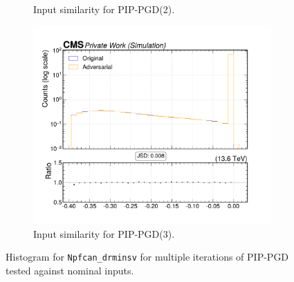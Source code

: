 \begin{figure}[htbp]
\begin{subfigure}[t]{0.32\textwidth}
    \caption*{Input similarity for PIP-PGD(2).}
  \end{subfigure}\hfill
  \begin{subfigure}[t]{0.32\textwidth}
    \includegraphics[width=\linewidth]{media/output/features/compare/combined_it_3/cmp_npf_arr_Npfcan_drminsv.pdf}
    \caption*{Input similarity for PIP-PGD(3).}
  \end{subfigure}

  \caption*{Histogram for \texttt{Npfcan\_drminsv} for multiple iterations of PIP-PGD tested against nominal inputs.}
  \label{fig:combined_input_Npfcan_drminsv}
\end{figure}


